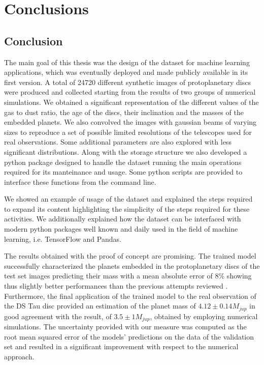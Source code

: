 \documentclass[a4paper,10pt]{report}
\begin{document}
\chapter{Conclusions}
\section{Conclusion}


The main goal of this thesis was the design of the dataset for machine learning applications,
which was eventually deployed and made publicly available in its first version. A total of 24720 different synthetic
images of protoplanetary discs were produced and collected starting from the results of two groups of numerical simulations.
We obtained a significant representation of the different values of the gas to dust ratio, the age of the discs,
their inclination and the masses of the embedded 
planets. We also convolved the images with gaussian beams of varying sizes to reproduce a set of possible limited resolutions
of the telescopes used for real observations. 
Some additional parameters are also explored with less significant distributions.
Along with the storage structure we also developed a python package designed to handle the dataset
running the main operations required for its manteinance and usage. 
Some python scripts are provided to interface these functions
from the command line.

We showed an example of usage of the dataset and explained the steps required to expand its content
highlighting the simplicity of the steps required for these activities.
We additionally explained how the dataset can be interfaced with modern python packages
well known and daily used in the field
of machine learning, i.e. TensorFlow and Pandas.

The results obtained with the proof of concept are promising. The trained model successfully
characterized the planets embedded in the protoplanetary discs of the test set images predicting their mass
with a mean absolute error of 8\% showing thus slightly better performances
than the previous attempts reviewed \citep{Auddy_2020}.
Furthermore, the final application of the trained model to the real observation of the DS Tau disc
provided an estimation of the planet mass of $4.12 \pm 0.14 M_{jup}$ in good agreement with the result, of
$3.5 \pm 1 M_{jup}$,
obtained by \citet{dstauv} employing numerical simulations. The uncertainty provided 
with our measure was computed as the root mean squared error of the models' predictions on the data of the validation
set and resulted in a significant improvement with respect to the numerical approach.
\end{document}
